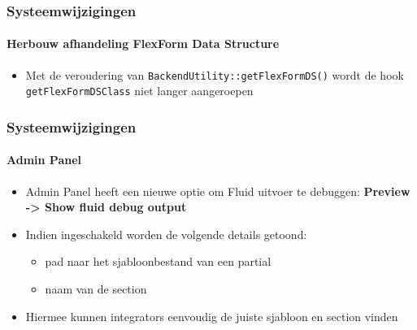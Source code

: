\begin{frame}[fragile]
	\frametitle{Systeemwijzigingen}
	\framesubtitle{Herbouw afhandeling FlexForm Data Structure}


	\begin{itemize}
		\item Met de veroudering van \texttt{BackendUtility::getFlexFormDS()} wordt de hook
			\texttt{getFlexFormDSClass} niet langer aangeroepen

	\end{itemize}

\end{frame}





\begin{frame}[fragile]
	\frametitle{Systeemwijzigingen}
	\framesubtitle{Admin Panel}

	\begin{itemize}
		\item Admin Panel heeft een nieuwe optie om Fluid uitvoer te debuggen:\newline
			\textbf{Preview -> Show fluid debug output}
		\item Indien ingeschakeld worden de volgende details getoond:

			\begin{itemize}
				\item pad naar het sjabloonbestand van een partial
				\item naam van de section
			\end{itemize}

		\item Hiermee kunnen integrators eenvoudig de juiste sjabloon en section vinden

	\end{itemize}

\end{frame}






